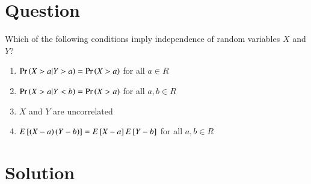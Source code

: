 \documentclass[journal,12pt,twocolumn]{IEEEtran}
\begin{document}
\section*{Question}
Which of the following conditions imply independence of random variables $X$ and $Y$?
\begin{enumerate}
    \item $\Pr\left(X>a|Y>a\right)=\Pr\left(X>a\right) $ for all $a\in R$
    \item $\Pr\left(X>a|Y<b\right)=\Pr\left(X>a\right) $ for all $a,b\in R$
    \item $X$ and $Y$ are uncorrelated
    \item $E{}\left[\left(X-a\right)\left(Y-b\right)\right]=E{}\left[X-a\right]E{}\left[Y-b\right]$ for all $a,b\in R$
\end{enumerate} 
\section*{Solution}
\end{document}
